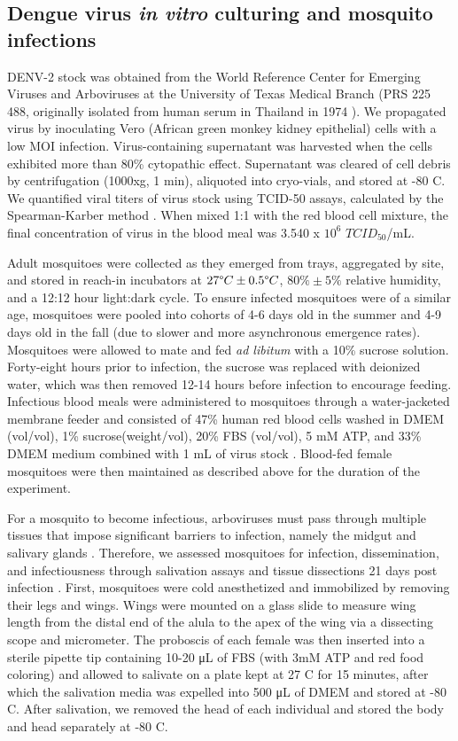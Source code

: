 \documentclass[12pt]{article}
\begin{document}
\subsection*{Dengue virus \textit{in vitro} culturing and mosquito infections}

DENV-2 stock was obtained from the World Reference Center for Emerging Viruses and Arboviruses at the University of Texas Medical Branch (PRS 225 488, originally isolated from human serum in Thailand in 1974 \cite{vazeille-falcoz1999}).
We propagated virus by inoculating Vero (African green monkey kidney epithelial) cells with a low MOI infection.
Virus-containing supernatant was harvested when the cells exhibited more than 80\% cytopathic effect.
Supernatant was cleared of cell debris by centrifugation (1000xg, 1 min), aliquoted into cryo-vials, and stored at -80 \degree C.
We quantified viral titers of virus stock using TCID-50 assays, calculated by the Spearman-Karber method \cite{shao2016,willard2017}.
When mixed 1:1 with the red blood cell mixture, the final concentration of virus in the blood meal was 3.540 x $10^6$ $TCID_{50}$/mL.

Adult mosquitoes were collected as they emerged from trays, aggregated by site, and stored in reach-in incubators at $27 \degree C \pm 0.5 \degree C$, $80\% \pm 5\%$ relative humidity, and a 12:12 hour light:dark cycle.
To ensure infected mosquitoes were of a similar age, mosquitoes were pooled into cohorts of 4-6 days old in the summer and 4-9 days old in the fall (due to slower and more asynchronous emergence rates).
Mosquitoes were allowed to mate and fed \textit{ad libitum} with a 10\% sucrose solution.
Forty-eight hours prior to infection, the sucrose was replaced with deionized water, which was then removed 12-14 hours before infection to encourage feeding.
Infectious blood meals were administered to mosquitoes through a water-jacketed membrane feeder and consisted of 47\% human red blood cells washed in DMEM (vol/vol), 1\% sucrose(weight/vol), 20\% FBS (vol/vol), 5 mM ATP, and 33\% DMEM medium combined with 1 mL of virus stock \cite{shan2016}.
Blood-fed female mosquitoes were then maintained as described above for the duration of the experiment.

For a mosquito to become infectious, arboviruses must pass through multiple tissues that impose significant barriers to infection, namely the midgut and salivary glands \cite{cheng2016}.
Therefore, we assessed mosquitoes for infection, dissemination, and infectiousness through salivation assays and tissue dissections 21 days post infection \cite{anderson2010}.
First, mosquitoes were cold anesthetized and immobilized by removing their legs and wings.
Wings were mounted on a glass slide to measure wing length from the distal end of the alula to the apex of the wing via a dissecting scope and micrometer.
The proboscis of each female was then inserted into a sterile pipette tip containing 10-20 \si{\micro\liter} of FBS (with 3mM ATP and red food coloring) and allowed to salivate  on a plate kept at 27 \degree C for 15 minutes, after which the salivation media was expelled into 500 \si{\micro\liter} of DMEM and stored at -80 \degree C.
After salivation, we removed the head of each individual and stored the body and head separately at -80 \degree C.
\end{document}
